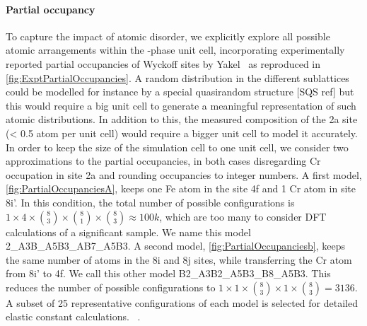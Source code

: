 \documentclass[superscriptaddress, 12pt]{revtex4-2}%
\begin{document}
\paragraph{Partial occupancy} 
To capture the impact of atomic disorder, we explicitly explore all possible atomic arrangements within the \textsigma-phase unit cell, incorporating experimentally reported partial occupancies of Wyckoff sites by Yakel~\cite{yakel_atom_1983} as reproduced in \autoref{fig:ExptPartialOccupancies}.
A random distribution in the different sublattices could be modelled for instance by a special quasirandom structure
[SQS ref] but  this would require a big unit cell to generate a meaningful representation of such atomic distributions. 
In addition to this, the measured composition of the 2a site (< 0.5 atom per unit cell) would require a bigger unit cell to model it accurately.
In order to keep the size of the simulation cell to one unit cell, we consider two approximations to the partial occupancies, in both cases disregarding Cr occupation in site 2a and rounding occupancies to integer numbers.
A first model, \autoref{fig:PartialOccupanciesA}, keeps one Fe atom in the site 4f and 1 Cr atom in site 8i'.
In this condition, the total number of possible configurations is $ 1 \times 4 \times \binom{8}{3}\times \binom{8}{1} \times \binom {8}{3} \approx 100k $, which are too many to consider DFT calculations of a significant sample. We name this model 2\_A3B\_A5B3\_AB7\_A5B3.
A second model, \autoref{fig:PartialOccupanciesb}, keeps the same number of atoms in the 8i and 8j sites, while
transferring the Cr atom from 8i' to 4f.
We call this other model B2\_A3B2\_A5B3\_B8\_A5B3.
This reduces the number of possible configurations to $ 1 \times 1 \times \binom{8}{3}\times 1 \times \binom {8}{3} = 3136 $.%
A subset of 25 representative configurations of each model is selected for detailed elastic constant calculations. ~\cite{golesorkhtabar_elastic_2013}.
\end{document}
